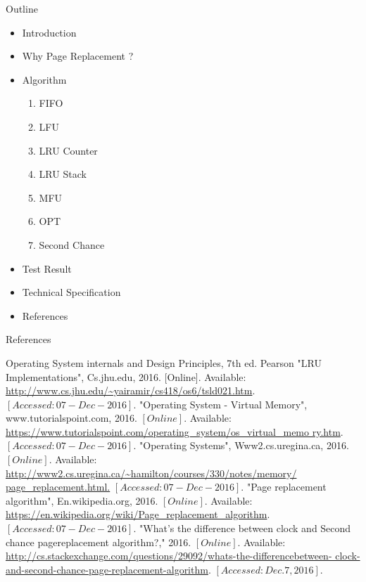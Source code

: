 \documentclass{beamer}
\begin{document}
\begin{frame}{Outline}
	\begin{itemize}
		\item Introduction
		\item Why Page Replacement ?
		\item Algorithm
		
		\begin{enumerate}
			\item FIFO
			\item LFU
			\item LRU Counter
			\item LRU Stack
			\item MFU
			\item OPT
			\item Second Chance
		\end{enumerate}
		\item Test Result
		\item Technical Specification
		\item \alert{References}
	\end{itemize}
\end{frame}	



\begin{frame}{References}
	\begin{thebibliography}{10}
		
		 Operating System internals and Design Principles, 7th ed. Pearson
		 "LRU Implementations", Cs.jhu.edu, 2016. [Online]. Available:
		\url{http://www.cs.jhu.edu/~yairamir/cs418/os6/tsld021.htm}.
		$[Accessed: 07- Dec- 2016].$ 
		 "Operating System - Virtual Memory", www.tutorialspoint.com,
		2016. $[Online].$ Available:
		\url{https://www.tutorialspoint.com/operating_system/os_virtual_memo
			ry.htm}. $[Accessed: 07- Dec- 2016].$
		 "Operating Systems", Www2.cs.uregina.ca, 2016. $[Online]$.
		Available:
		\url{http://www2.cs.uregina.ca/~hamilton/courses/330/notes/memory/
		page_replacement.html.} $[Accessed: 07- Dec- 2016].$
		 "Page replacement algorithm", En.wikipedia.org, 2016. $[Online].$
		Available:
		\url{https://en.wikipedia.org/wiki/Page_replacement_algorithm}.
		$[Accessed: 07- Dec- 2016].$
		 "What’s the difference between clock and Second chance pagereplacement
		algorithm?," 2016. $[Online].$ Available:
		\url{http://cs.stackexchange.com/questions/29092/whats-the-differencebetween-
		clock-and-second-chance-page-replacement-algorithm}.
		$[Accessed: Dec. 7, 2016].$		
		
		
		
		
		
	\end{thebibliography}
	
\end{frame}	
\end{document}
